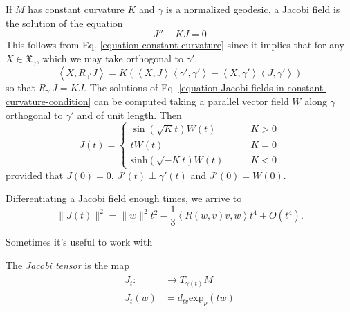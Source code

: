 \begin{example}
\label{example-jacobi-fields-in-constant-curvature-condition}
If $M$ has constant curvature $K$ and $\gamma$ is a normalized geodesic, a 
Jacobi field is the solution of the equation
\begin{equation}
\label{equation-Jacobi-fields-in-constant-curvature-condition}
J''+KJ=0
\end{equation}
This follows from Eq. \ref{equation-constant-curvature} since it implies that
for any $X\in\mathfrak{X}_\gamma$, which we may take orthogonal to $\gamma'$,
$$
\left<X,R_{\gamma'}J\right>
=K(\left<X,J\right>\left<\gamma',\gamma'\right>
-\left<X,\gamma'\right>\left<J,\gamma'\right>)
$$
so that $R_{\gamma'}J=KJ$. The solutions of Eq.
\ref{equation-Jacobi-fields-in-constant-curvature-condition} can be computed taking a
parallel vector field $W$ along $\gamma$ orthogonal to $\gamma'$ and of unit
length. Then
\begin{equation}
\label{equation-Jacobi-fields-in-constant-curvature}
J(t)=\begin{cases}
\sin(\sqrt{K}t)W(t)\qquad & K>0\\
tW(t)\qquad &K=0\\
\text{sinh}(\sqrt{-K}t)W(t)\qquad &K<0
\end{cases}
\end{equation}
provided that $J(0)=0$, $J'(t)\perp \gamma'(t)$ and $J'(0)=W(0)$.
\end{example}

\begin{proposition}
\label{proposition-Jacobi-field-Taylor-expansion}
Differentiating a Jacobi field enough times, we arrive to
\begin{equation}
\label{equation-Jacobi-field-Taylor-expansion}
\|J(t)\|^2=\|w\|^2t^2-\frac{1}{3}\left<R(w,v)v,w\right>t^4+O(t^4).
\end{equation}
\end{proposition}


Sometimes it's useful to work with

\begin{definition}
\label{definition-Jacobi-tensor}
The {\it Jacobi tensor} is the map
\begin{align*}
	\overline{J}_t:  &\longrightarrow T_{\gamma(t)}M \\
	 \overline{J}_t(w)&=d_{tv}\text{exp}_p(tw)
\end{align*}
\end{definition}

